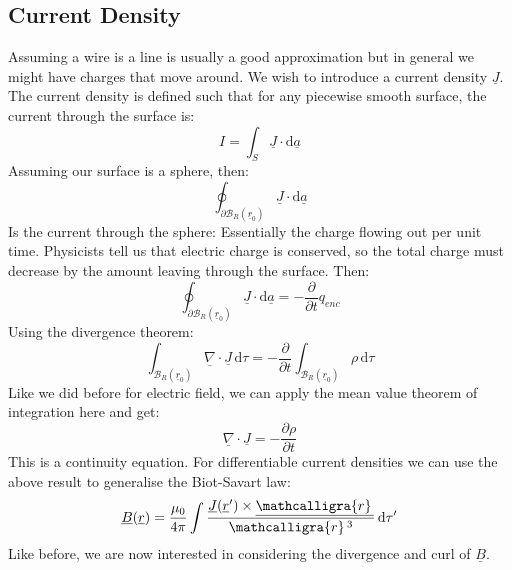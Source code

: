 \documentclass[12pt]{article}
\newcommand{\pf}[2]{\frac{\partial #1}{\partial #2}}
\newcommand{\dive}[1]{\underline{\nabla}\cdot\underline{#1}}
\newcommand{\scriptr}{\ensuremath{\mathcalligra{r}}\,}
\begin{document}
\subsection{Current Density}
Assuming a wire is a line is usually a good approximation but in general we might have charges that move around. We wish to introduce a current density \(\underline{J}\). The current density is defined such that for any piecewise smooth surface, the current through the surface is:
\[I=\int_S\underline{J}\cdot\text{d}\underline{a}\]
Assuming our surface is a sphere, then:
\[\oint_{\partial\mathcal{B}_R(\underline{r}_0)}\underline{J}\cdot\text{d}\underline{a}\]
Is the current through the sphere: Essentially the charge flowing out per unit time. Physicists tell us that electric charge is conserved, so the total charge must decrease by the amount leaving through the surface. Then:
\[\oint_{\partial\mathcal{B}_R(\underline{r}_0)}\underline{J}\cdot\text{d}\underline{a}=-\pf{}{t}q_{enc}\]
Using the divergence theorem:
\[\int_{\mathcal{B}_R(\underline{r}_0)}\dive{J}\,\text{d}\tau=-\pf{}{t}\int_{\mathcal{B}_R(\underline{r}_0)}\rho\,\text{d}\tau\]
Like we did before for electric field, we can apply the mean value theorem of integration here and get:
\[\dive{J}=-\pf{\rho}{t}\]
This is a continuity equation. For differentiable current densities we can use the above result to generalise the Biot-Savart law:
\[\underline{B}(\underline{r})=\frac{\mu_0}{4\pi}\int\frac{\underline{J}(\underline{r}')\times\underline{\scriptr}}{\scriptr^3}\,\text{d}\tau'\]
Like before, we are now interested in considering the divergence and curl of \(\underline{B}\).
\end{document}
